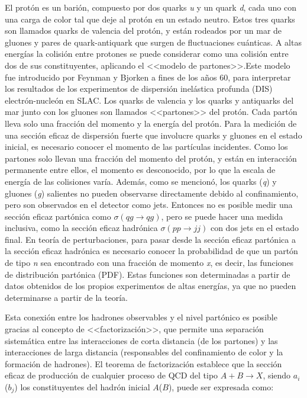 El protón es un barión, compuesto por dos quarks \textit{u} y un quark \textit{d}, cada uno con una carga de color tal que deje al protón en un estado neutro. Estos tres quarks son llamados quarks de valencia del protón, y están rodeados por un mar de gluones y pares de quark-antiquark que surgen de fluctuaciones cuánticas. A altas energías la colisión entre protones se puede considerar como una colisión entre dos de sus constituyentes, aplicando el <<modelo de partones>>.Este modelo fue introducido por Feynman \cite{PhysRevLett.23.1415} y Bjorken \cite{PhysRev.185.1975} a fines de los años 60, para interpretar los resultados de los experimentos de dispersión inelástica profunda (DIS) electrón-nucleón en SLAC. Los quarks de valencia y los quarks y antiquarks del mar junto con los gluones son llamados <<partones>> del protón. Cada partón lleva solo una fracción del momento y la energía del protón. Para la medición de una sección eficaz de dispersión fuerte que involucre quarks y gluones en el estado inicial, es necesario conocer el momento de las partículas incidentes. Como los partones solo llevan una fracción del momento del protón, y están en interacción permanente entre ellos, el momento es desconocido, por lo que la escala de energía de las colisiones varía. Además, como se mencionó, los quarks (\textit{q}) y gluones (\textit{g}) salientes no pueden observarse directamente debido al confinamiento, pero son observados en el detector como jets. Entonces no es posible medir una sección eficaz partónica como $\sigma(qg \rightarrow qg)$, pero se puede hacer una medida inclusiva, como la sección eficaz hadrónica $\sigma(pp \rightarrow jj)$ con dos jets en el estado final. En teoría de perturbaciones, para pasar desde la sección eficaz partónica a la sección eficaz hadrónica es necesario conocer la probabilidad de que un partón de tipo \textit{n} sea encontrado con una fracción de momento \textit{x}, es decir, las funciones de distribución partónica (PDF). Estas funciones son determinadas a partir de datos obtenidos de los propios experimentos de altas energías, ya que no pueden determinarse a partir de la teoría. 

Esta conexión entre los hadrones observables y el nivel partónico es posible gracias al concepto de <<factorización>>, que permite una separación sistemática entre las interacciones de corta distancia (de los partones) y las interacciones de larga distancia (responsables del confinamiento de color y la formación de hadrones). El teorema de factorización \cite{ELLIS1978281} establece que la sección eficaz de producción de cualquier proceso de QCD del tipo $A + B \rightarrow X$, siendo $a_{i}$ ($b_{j}$) los constituyentes del hadrón inicial $A$($B$), puede ser expresada como: 

